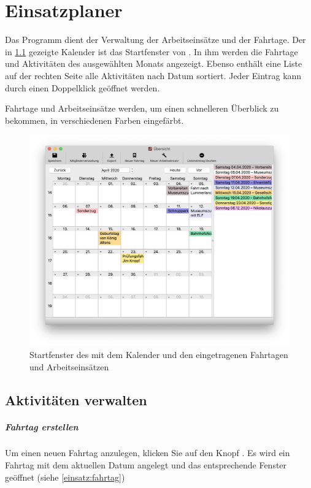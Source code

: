 \chapter{Einsatzplaner}\label{einsatz:kalender}
Das Programm \Einsatz dient der Verwaltung der Arbeitseinsätze und der Fahrtage.
Der in \cref{fig:einsatz:kalender} gezeigte Kalender ist das Startfenster von \Einsatz.
In ihm werden die Fahrtage und Aktivitäten des ausgewählten Monats angezeigt.
Ebenso enthält eine Liste auf der rechten Seite alle Aktivitäten nach Datum sortiert.
Jeder Eintrag kann durch einen Doppelklick geöffnet werden.


Fahrtage und Arbeitseinsätze werden,
um einen schnelleren Überblick zu bekommen,
in verschiedenen Farben eingefärbt.

\begin{figure}[h]
  \includegraphics[width=\textwidth]{img/kalender}
  \caption{
  Startfenster des \Einsatz mit dem Kalender und den eingetragenen Fahrtagen und Arbeitseinsätzen}
  \label{fig:einsatz:kalender}
\end{figure}



\section{Aktivitäten verwalten}
\label{einsatz:kalender:anlegen}
\label{einsatz:kalender:löschen}
\paragraph{Fahrtag erstellen}
Um einen neuen Fahrtag anzulegen, klicken Sie auf den Knopf .
Es wird ein Fahrtag mit dem aktuellen Datum angelegt und das entsprechende Fenster geöffnet (siehe \cref{einsatz:fahrtag})

